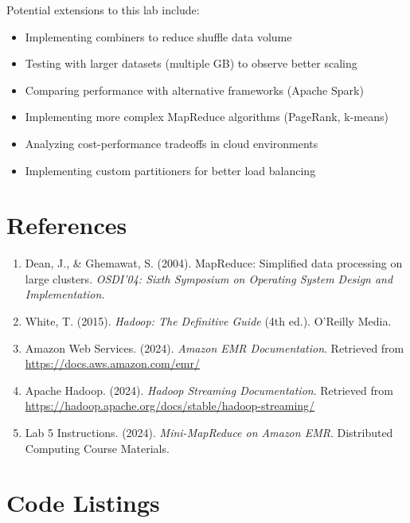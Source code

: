 \documentclass[11pt,a4paper]{article}
\begin{document}
Potential extensions to this lab include:

\begin{itemize}
    \item Implementing combiners to reduce shuffle data volume
    \item Testing with larger datasets (multiple GB) to observe better scaling
    \item Comparing performance with alternative frameworks (Apache Spark)
    \item Implementing more complex MapReduce algorithms (PageRank, k-means)
    \item Analyzing cost-performance tradeoffs in cloud environments
    \item Implementing custom partitioners for better load balancing
\end{itemize}

\section{References}

\begin{enumerate}
    \item Dean, J., \& Ghemawat, S. (2004). MapReduce: Simplified data processing on large clusters. \textit{OSDI'04: Sixth Symposium on Operating System Design and Implementation}.
    
    \item White, T. (2015). \textit{Hadoop: The Definitive Guide} (4th ed.). O'Reilly Media.
    
    \item Amazon Web Services. (2024). \textit{Amazon EMR Documentation}. Retrieved from \url{https://docs.aws.amazon.com/emr/}
    
    \item Apache Hadoop. (2024). \textit{Hadoop Streaming Documentation}. Retrieved from \url{https://hadoop.apache.org/docs/stable/hadoop-streaming/}
    
    \item Lab 5 Instructions. (2024). \textit{Mini-MapReduce on Amazon EMR}. Distributed Computing Course Materials.
\end{enumerate}

\appendix

\section{Code Listings}
\end{document}

